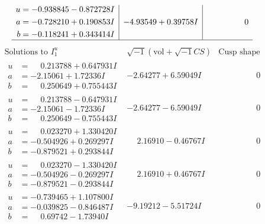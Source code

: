 \documentclass[1p]{elsarticle_modified}
\theoremstyle{definition}
\newcommand{\I}{\sqrt{-1}}
\begin{document}
$$\begin{array}{c|c|c}
\begin{aligned}
u &= -0.938845 - 0.872728 I \\
a &= -0.728210 + 0.190853 I \\
b &= -0.118241 + 0.343414 I\end{aligned}
 & -4.93549 + 0.39758 I & \phantom{-0.000000 } 0\\
 \hline 
 \end{array}$$\newpage$$\begin{array}{c|c|c}  
\text{Solutions to }I^u_{1}& \I (\text{vol} + \sqrt{-1}CS) & \text{Cusp shape}\\
 \hline 
\begin{aligned}
u &= \phantom{-}0.213788 + 0.647931 I \\
a &= -2.15061 + 1.72336 I \\
b &= \phantom{-}0.250649 + 0.755443 I\end{aligned}
 & -2.64277 + 6.59049 I & \phantom{-0.000000 } 0 \\ \hline\begin{aligned}
u &= \phantom{-}0.213788 - 0.647931 I \\
a &= -2.15061 - 1.72336 I \\
b &= \phantom{-}0.250649 - 0.755443 I\end{aligned}
 & -2.64277 - 6.59049 I & \phantom{-0.000000 } 0 \\ \hline\begin{aligned}
u &= \phantom{-}0.023270 + 1.330420 I \\
a &= -0.504926 + 0.269297 I \\
b &= -0.879521 + 0.293844 I\end{aligned}
 & \phantom{-}2.16910 - 0.46767 I & \phantom{-0.000000 } 0 \\ \hline\begin{aligned}
u &= \phantom{-}0.023270 - 1.330420 I \\
a &= -0.504926 - 0.269297 I \\
b &= -0.879521 - 0.293844 I\end{aligned}
 & \phantom{-}2.16910 + 0.46767 I & \phantom{-0.000000 } 0 \\ \hline\begin{aligned}
u &= -0.739465 + 1.107800 I \\
a &= -0.039825 - 0.846487 I \\
b &= \phantom{-}0.69742 - 1.73940 I\end{aligned}
 & -9.19212 - 5.51724 I & \phantom{-0.000000 } 0 \\ \hline\begin{aligned}

\end{aligned}
\end{array}$$
\end{document}
